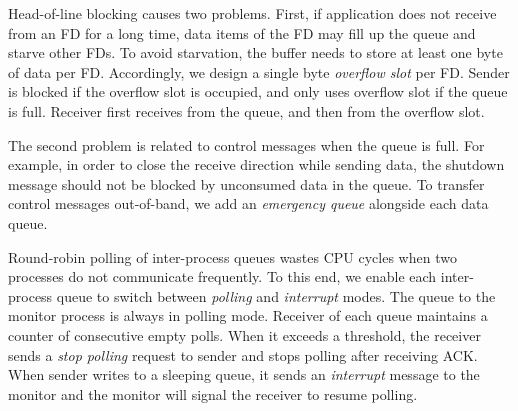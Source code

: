 Head-of-line blocking causes two problems. First, if application does not receive from an FD for a long time, data items of the FD may fill up the queue and starve other FDs. To avoid starvation, the buffer needs to store at least one byte of data per FD. Accordingly, we design a single byte \textit{overflow slot} per FD. Sender is blocked if the overflow slot is occupied, and only uses overflow slot if the queue is full. Receiver first receives from the queue, and then from the overflow slot. 

The second problem is related to control messages when the queue is full. For example, in order to close the receive direction while sending data, the shutdown message should not be blocked by unconsumed data in the queue. To transfer control messages out-of-band, we add an \textit{emergency queue} alongside each data queue.

Round-robin polling of inter-process queues wastes CPU cycles when two processes do not communicate frequently. To this end, we enable each inter-process queue to switch between \textit{polling} and \textit{interrupt} modes. The queue to the monitor process is always in polling mode. Receiver of each queue maintains a counter of consecutive empty polls. When it exceeds a threshold, the receiver sends a \textit{stop polling} request to sender and stops polling after receiving ACK. When sender writes to a sleeping queue, it sends an \textit{interrupt} message to the monitor and the monitor will signal the receiver to resume polling. 





